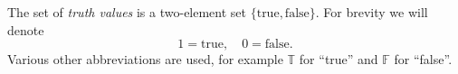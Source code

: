 

\setcounter{section}{1}
\setcounter{subsection}{2}
\setcounter{dfn}{1}

The set of \emph{truth values} is a two-element set $\{\text{true}, \text{false}\}$.
For brevity we will denote
\[
1 = \text{true}, \quad 0 = \text{false}.
\]
Various other abbreviations are used, for example $\mathbb{T}$ for ``true'' and $\mathbb{F}$ for ``false''.



